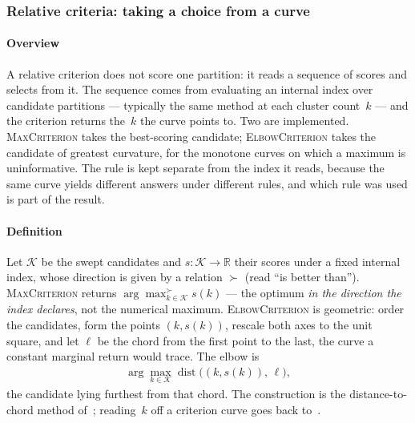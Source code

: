 \subsubsection{Relative criteria: taking a choice from a curve}
\label{sec:measure:relative}

\paragraph{Overview}
\label{sec:measure:relative:overview}
A relative criterion does not score one partition: it reads a sequence of
scores and selects from it. The sequence comes from evaluating an internal
index over candidate partitions --- typically the same method at each
cluster count~$k$ --- and the criterion returns the~$k$ the curve points
to. Two are implemented. \textsc{MaxCriterion} takes the best-scoring
candidate; \textsc{ElbowCriterion} takes the candidate of greatest
curvature, for the monotone curves on which a maximum is uninformative.
The rule is kept separate from the index it reads, because the same curve
yields different answers under different rules, and which rule was used is
part of the result.

\paragraph{Definition}
\label{sec:measure:relative:definition}
Let $\mathcal{K}$ be the swept candidates and $s\colon \mathcal{K}\to
\mathbb{R}$ their scores under a fixed internal index, whose direction is
given by a relation $\succ$ (read ``is better than'').
\textsc{MaxCriterion} returns $\arg\max^{\succ}_{k\in\mathcal{K}} s(k)$ ---
the optimum \emph{in the direction the index declares}, not the numerical
maximum. \textsc{ElbowCriterion} is geometric: order the candidates, form
the points $(k, s(k))$, rescale both axes to the unit square, and let
$\ell$ be the chord from the first point to the last, the curve a constant
marginal return would trace. The elbow is
\begin{align}
    \arg\max_{k\in\mathcal{K}} \operatorname{dist}\big((k, s(k)),\, \ell\big),
\end{align}
the candidate lying furthest from that chord. The construction is the
distance-to-chord method of~\cite{ref_27}; reading~$k$ off a criterion
curve goes back to~\cite{ref_26}.

